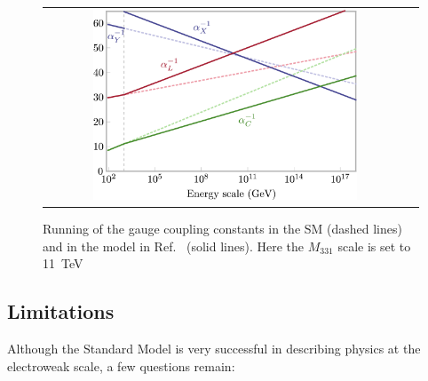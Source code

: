 \begin{figure}[tbh!]
	\centering
	\begin{tabular}{cc}
		\includegraphics[width=0.75\textwidth]{theory/pics/gauge_unification.png}
	\end{tabular}
	\caption{Running of the gauge coupling constants in the SM (dashed lines) and in the model in Ref.~\cite{PhysRevD.90.013005} (solid lines). Here the $M_{331}$ scale is set to 11~TeV}
	\label{fig:gauge_unification}
\end{figure}

\clearpage

\subsection{Limitations}


Although the Standard Model is very successful in describing physics at the electroweak scale, a few questions remain:

